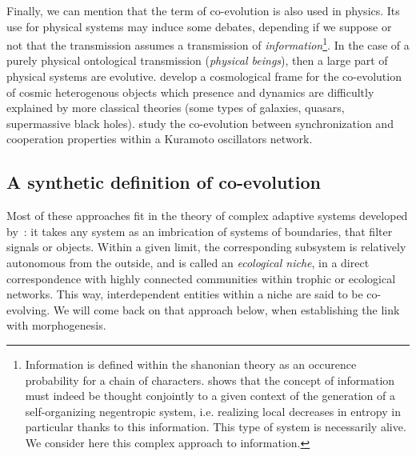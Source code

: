 \documentclass[letterpaper]{article}
\begin{document}
Finally, we can mention that the term of co-evolution is also used in physics. Its use for physical systems may induce some debates, depending if we suppose or not that the transmission assumes a transmission of \emph{information}\footnote{Information is defined within the shanonian theory as an occurence probability for a chain of characters. \cite{morin1976methode} shows that the concept of information must indeed be thought conjointly to a given context of the generation of a self-organizing negentropic system, i.e. realizing local decreases in entropy in particular thanks to this information. This type of system is necessarily alive. We consider here this complex approach to information.}. In the case of a purely physical ontological transmission (\emph{physical beings}), then a large part of physical systems are evolutive. \cite{hopkins2008cosmological} develop a cosmological frame for the co-evolution of cosmic heterogenous objects which presence and dynamics are difficultly explained by more classical theories (some types of galaxies, quasars, supermassive black holes). \cite{antonioni2017coevolution} study the co-evolution between synchronization and cooperation properties within a Kuramoto oscillators network.




\subsection{A synthetic definition of co-evolution}


Most of these approaches fit in the theory of complex adaptive systems developed by~\cite{holland2012signals}: it takes any system as an imbrication of systems of boundaries, that filter signals or objects. Within a given limit, the corresponding subsystem is relatively autonomous from the outside, and is called an \emph{ecological niche}, in a direct correspondence with highly connected communities within trophic or ecological networks. This way, interdependent entities within a niche are said to be co-evolving. We will come back on that approach below, when establishing the link with morphogenesis.
\end{document}

